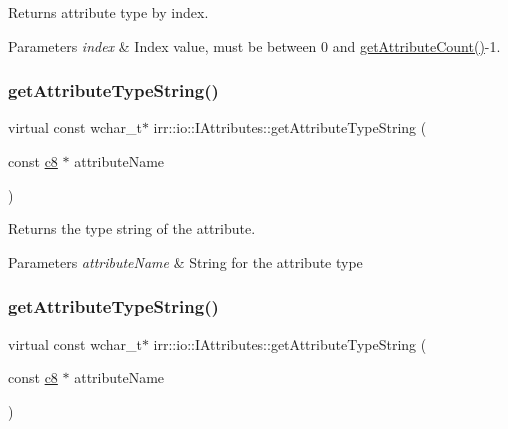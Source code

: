 Returns attribute type by index. 


\begin{DoxyParams}{Parameters}
{\em index} & Index value, must be between 0 and \hyperlink{classirr_1_1io_1_1IAttributes_a796bdd9440ee7ba0b6742a90a82870b6}{get\+Attribute\+Count()}-\/1. \\
\hline
\end{DoxyParams}
\mbox{\label{classirr_1_1io_1_1IAttributes_a6a460acccdbf5b2f8eac8d2bd6a1e428}} 
\subsubsection{\texorpdfstring{get\+Attribute\+Type\+String()}{getAttributeTypeString()}\hspace{0.1cm}{\footnotesize\ttfamily [1/4]}}
{\footnotesize\ttfamily virtual const wchar\+\_\+t$\ast$ irr\+::io\+::\+I\+Attributes\+::get\+Attribute\+Type\+String (\begin{DoxyParamCaption}\item[{const \hyperlink{namespaceirr_a9395eaea339bcb546b319e9c96bf7410}{c8} $\ast$}]{attribute\+Name }\end{DoxyParamCaption})\hspace{0.3cm}{\ttfamily [pure virtual]}}



Returns the type string of the attribute. 


\begin{DoxyParams}{Parameters}
{\em attribute\+Name} & String for the attribute type \\
\hline
\end{DoxyParams}
\mbox{\label{classirr_1_1io_1_1IAttributes_a6a460acccdbf5b2f8eac8d2bd6a1e428}} 
\subsubsection{\texorpdfstring{get\+Attribute\+Type\+String()}{getAttributeTypeString()}\hspace{0.1cm}{\footnotesize\ttfamily [2/4]}}
{\footnotesize\ttfamily virtual const wchar\+\_\+t$\ast$ irr\+::io\+::\+I\+Attributes\+::get\+Attribute\+Type\+String (\begin{DoxyParamCaption}\item[{const \hyperlink{namespaceirr_a9395eaea339bcb546b319e9c96bf7410}{c8} $\ast$}]{attribute\+Name }\end{DoxyParamCaption})\hspace{0.3cm}{\ttfamily [pure virtual]}}



